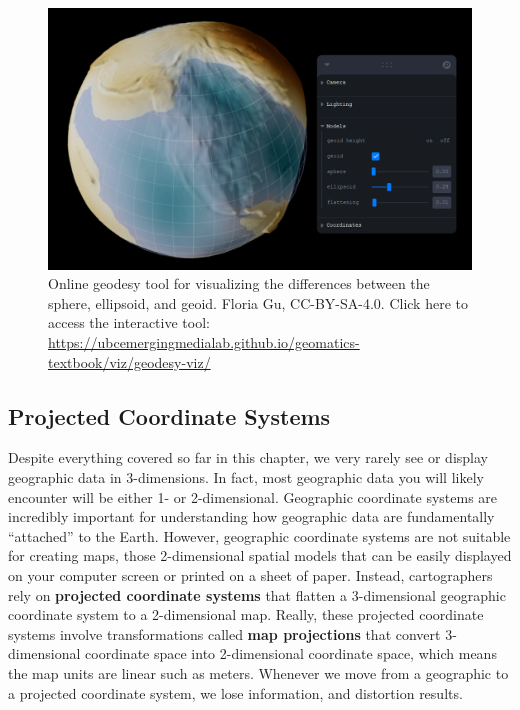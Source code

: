\documentclass[
]{book}
\begin{document}
\begin{figure}
\includegraphics[width=0.75\linewidth]{images/02-geodesy-visualization-static} \caption{Online geodesy tool for visualizing the differences between the sphere, ellipsoid, and geoid. Floria Gu, CC-BY-SA-4.0. Click here to access the interactive tool: \url{https://ubcemergingmedialab.github.io/geomatics-textbook/viz/geodesy-viz/}}\label{fig:2-geodesy-visualization-static}
\end{figure}

\subsection{Projected Coordinate Systems}\label{projected-coordinate-systems}

Despite everything covered so far in this chapter, we very rarely see or display geographic data in 3-dimensions. In fact, most geographic data you will likely encounter will be either 1- or 2-dimensional. Geographic coordinate systems are incredibly important for understanding how geographic data are fundamentally ``attached'' to the Earth. However, geographic coordinate systems are not suitable for creating maps, those 2-dimensional spatial models that can be easily displayed on your computer screen or printed on a sheet of paper. Instead, cartographers rely on \textbf{projected coordinate systems} that flatten a 3-dimensional geographic coordinate system to a 2-dimensional map. Really, these projected coordinate systems involve transformations called \textbf{map projections} that convert 3-dimensional coordinate space into 2-dimensional coordinate space, which means the map units are linear such as meters. Whenever we move from a geographic to a projected coordinate system, we lose information, and distortion results.
\end{document}

